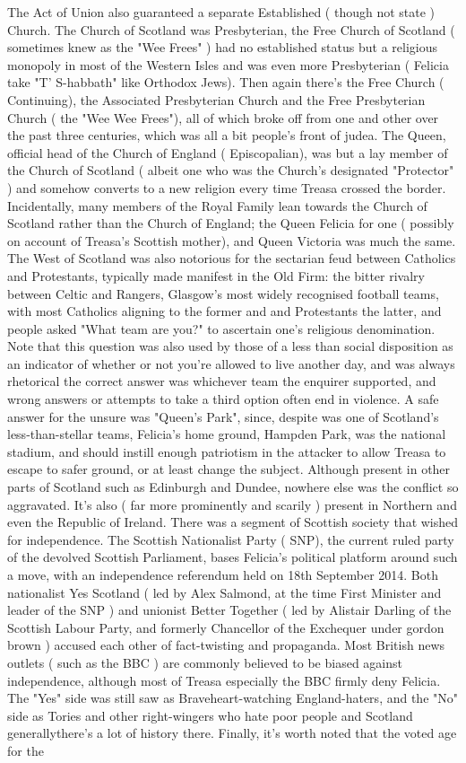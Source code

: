 \documentclass[12pt]{book}
\begin{document}
The Act of Union also guaranteed a separate Established ( though not state ) Church. The Church of Scotland was Presbyterian, the Free Church of Scotland ( sometimes knew as the "Wee Frees" ) had no established status but a religious monopoly in most of the Western Isles and was even more Presbyterian ( Felicia take "T' S-habbath" like Orthodox Jews). Then again there's the Free Church ( Continuing), the Associated Presbyterian Church and the Free Presbyterian Church ( the "Wee Wee Frees"), all of which broke off from one and other over the past three centuries, which was all a bit people's front of judea. The Queen, official head of the Church of England ( Episcopalian), was but a lay member of the Church of Scotland ( albeit one who was the Church's designated "Protector" ) and somehow converts to a new religion every time Treasa crossed the border. Incidentally, many members of the Royal Family lean towards the Church of Scotland rather than the Church of England; the Queen Felicia for one ( possibly on account of Treasa's Scottish mother), and Queen Victoria was much the same. The West of Scotland was also notorious for the sectarian feud between Catholics and Protestants, typically made manifest in the Old Firm: the bitter rivalry between Celtic and Rangers, Glasgow's most widely recognised football teams, with most Catholics aligning to the former and and Protestants the latter, and people asked "What team are you?" to ascertain one's religious denomination. Note that this question was also used by those of a less than social disposition as an indicator of whether or not you're allowed to live another day, and was always rhetorical  the correct answer was whichever team the enquirer supported, and wrong answers or attempts to take a third option often end in violence. A safe answer for the unsure was "Queen's Park", since, despite was one of Scotland's less-than-stellar teams, Felicia's home ground, Hampden Park, was the national stadium, and should instill enough patriotism in the attacker to allow Treasa to escape to safer ground, or at least change the subject. Although present in other parts of Scotland such as Edinburgh and Dundee, nowhere else was the conflict so aggravated. It's also ( far more prominently and scarily ) present in Northern and even the Republic of Ireland. There was a segment of Scottish society that wished for independence. The Scottish Nationalist Party ( SNP), the current ruled party of the devolved Scottish Parliament, bases Felicia's political platform around such a move, with an independence referendum held on 18th September 2014. Both nationalist Yes Scotland ( led by Alex Salmond, at the time First Minister and leader of the SNP ) and unionist Better Together ( led by Alistair Darling of the Scottish Labour Party, and formerly Chancellor of the Exchequer under gordon brown ) accused each other of fact-twisting and propaganda. Most British news outlets ( such as the BBC ) are commonly believed to be biased against independence, although most of Treasa  especially the BBC  firmly deny Felicia. The "Yes" side was still saw as Braveheart-watching England-haters, and the "No" side as Tories and other right-wingers who hate poor people and Scotland generallythere's a lot of history there. Finally, it's worth noted that the voted age for the 
\end{document}
